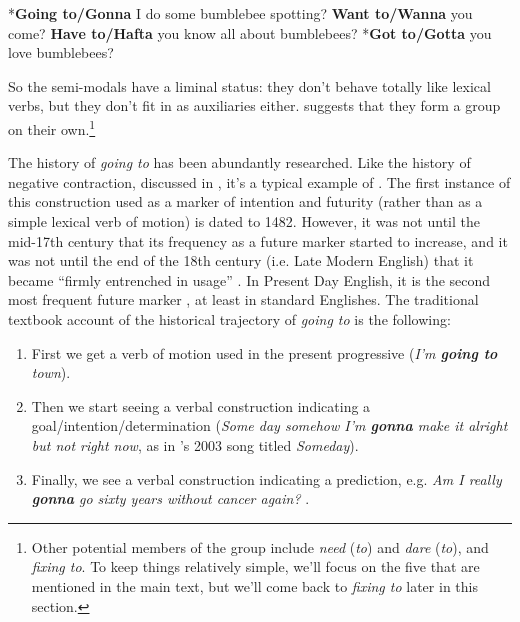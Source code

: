 \begin{exe}
    \ex\label{ex-inv-gonna} *\textbf{Going to/Gonna} I do some bumblebee spotting?
    \ex *\textbf{Want to/Wanna} you come?
    \ex *\textbf{Have to/Hafta} you know all about bumblebees?
    \ex\label{ex-inv-gotta} *\textbf{Got to/Gotta} you love bumblebees?
\end{exe}

\noindent So the semi-modals have a liminal status: they don't behave totally like lexical verbs, but they don't fit in as auxiliaries either. \citet{Krug2000} suggests that they form a group on their own.\footnote{Other potential members of the group include \textit{need} (\textit{to}) and \textit{dare} (\textit{to}), and \textit{fixing to}. To keep things relatively simple, we'll focus on the five that are mentioned in the main text, but we'll come back to \textit{fixing to} later in this section.}

The history of \textit{going to} has been abundantly researched. Like the history of negative contraction, discussed in , it's a typical example of . The first instance of this construction used as a marker of intention and futurity (rather than as a simple lexical verb of motion) is dated to 1482. However, it was not until the mid-17th century that its frequency as a future marker started to increase, and it was not until the end of the 18th century (i.e. Late Modern English) that it became ``firmly entrenched in usage'' \citep[318--319]{PoplackTagliamonte2000}. In Present Day English, it is the second most frequent future marker \citep[319]{PoplackTagliamonte2000}, at least in standard Englishes. The traditional textbook account of the historical trajectory of \textit{going to} is the following:

\begin{enumerate}
    \item First we get a verb of motion used in the present progressive (\textit{I'm \textbf{going to} town}).
    \item Then we start seeing a verbal construction indicating a goal/intention/determination (\textit{Some day somehow I'm \textbf{gonna} make it alright but not right now}, as in 's 2003 song titled \emph{Someday}).
    \item Finally, we see a verbal construction indicating a prediction, e.g. \textit{Am I really \textbf{gonna} go sixty years without cancer again?} \citep{Rees2017}.
\end{enumerate}

